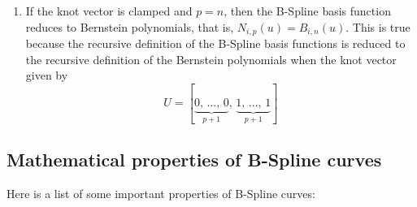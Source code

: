 \begin{enumerate}
    \item If the knot vector is clamped and $p=n$, then the B-Spline basis function reduces to Bernstein polynomials, that is, $N_{i,p}(u)=B_{i,n}(u)$. This is true because the recursive definition of the B-Spline basis functions is reduced to the recursive definition of the Bernstein polynomials when the knot vector given by
    \begin{equation*}
            U = [\underbrace{0,\, \dots,\, 0}_{p+1},\, \underbrace{1,\, \dots,\, 1}_{p+1}]
    \end{equation*}
    
\end{enumerate}



\subsection{Mathematical properties of B-Spline curves}
Here is a list of some important properties of B-Spline curves:

